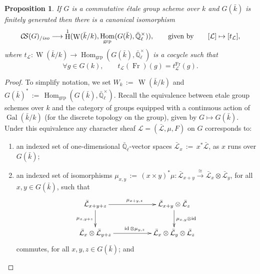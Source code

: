 \documentclass[11pt]{amsart}
\makeatletter
\theoremstyle{plain}
\newtheorem{proposition}[theorem]{Proposition}
\theoremstyle{definition}
\theoremstyle{remark}
\newcommand{\EE}{\mathbb{\bar Q}_\ell}
\newcommand{\bFq}{\bar{k}}
\newcommand{\Fq}{k}
\newcommand{\EEx}{\EE^\times}
\DeclareMathOperator{\Gal}{Gal}
\DeclareMathOperator{\Weil}{W}
\newcommand{\Frob}{{\operatorname{Fr}}}
\DeclareMathOperator{\Hom}{Hom}
\DeclareMathOperator{\id}{id}
\DeclareMathOperator{\Hh}{H}
\newcommand{\ceq}{{\, :=\, }}
\newcommand{\iso}{{\ \cong\ }}
\newcommand{\cs}[1]{{\mathcal{#1}}}
\newcommand{\gcs}[1]{{\mathcal{\bar #1}}}
\newcommand{\CS}{{\mathcal{C\hskip-1.8pt S}}}
\newcommand{\CSiso}[1]{\CS(#1)_{/\textit{iso}}}
\newcommand{\labitem}[2]{%
\def\@itemlabel{\textbf{#1}}
\item
\def\@currentlabel{#1}\label{#2}}
\makeatother
\begin{document}
%

\begin{proposition}\label{prop:etale}
  If $G$ is a commutative \'etale group scheme over $\Fq$ and
  $G(\bFq)$ is finitely generated then there is a canonical
  isomorphism
  \[
  \CSiso{G} \longrightarrow \Hh^1(\Weil(\bFq/\Fq), \Hom_\text{grp}(G(\bFq),\EEx)),
  \qquad \text{given by}\qquad
  [\cs{L}] \mapsto [t_\cs{L}],
  \]
  where $t_\cs{L}: \Weil(\bFq/\Fq)\to \Hom_\text{grp}(G(\bFq),\EEx)$ is a cocycle such that
  \[
  \forall g\in G(\Fq), \qquad t_\cs{L}(\Frob)(g) = t^\Frob_\cs{L}(g).
  \]
\end{proposition}

\begin{proof}
  To simplify notation, we set $W_\Fq \ceq \Weil(\bFq/\Fq)$ and
  $G(\bFq)^* \ceq \Hom_\text{grp}(G(\bFq),\EEx)$.  Recall the
  equivalence between etale group schemes over $\Fq$ and the category
  of groups equipped with a continuous action of $\Gal(\bFq/\Fq)$ (for
  the discrete topology on the group), given by $G \mapsto G(\bFq)$.
  Under this equivalence any character sheaf $\cs{L}=(\gcs{L},\mu,F)$
  on $G$ corresponds to:
  \begin{enumerate}
  \labitem{(cs.0)}{cs.0} an indexed set of one-dimensional
    $\EE$-vector spaces $\gcs{L}_x \ceq x^*\gcs{L}$, as $x$ runs over
    $G(\bFq)$;

  \labitem{(cs.1)}{cs.1} an indexed set of isomorphisms
    $\mu_{x,y} \ceq (x \times y)^*\mu : \gcs{L}_{x+y} \mathop{\longrightarrow}\limits^{\iso} \gcs{L}_{x} \otimes \gcs{L}_{y}$,
    for all $x,y \in G(\bFq)$, such that
    \[
    \xymatrix{
      \gcs{L}_{x+y+z} \ar[rr]^{\mu_{x+y,z}} \ar[d]_{\mu_{x,y+z}}
      && \gcs{L}_{x+y}\otimes \gcs{L}_{z} \ar[d]^{\mu_{x,y} \otimes \id} \\
      \gcs{L}_{x} \otimes \gcs{L}_{y+z} \ar[rr]^{\id \otimes \mu_{y,z}}
      && \gcs{L}_{x} \otimes\gcs{L}_{y} \otimes \gcs{L}_{z}\\
      }
    \]
    commutes, for all $x,y,z\in G(\bFq)$; and


\end{enumerate}
\end{proof}
\end{document}
